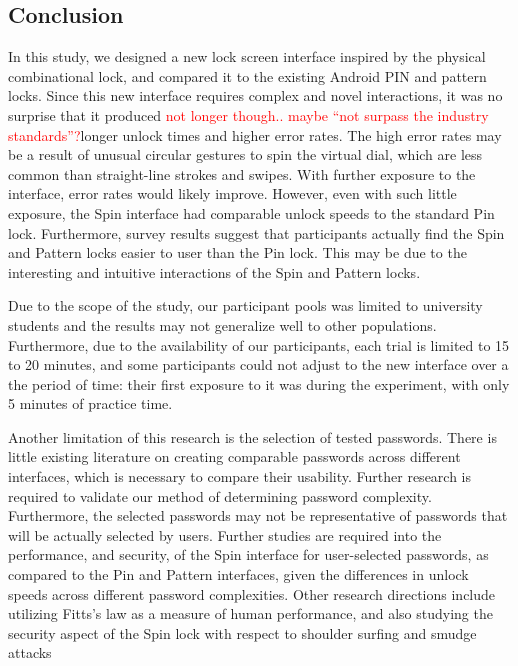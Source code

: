 \documentclass{sigchi}
\newcommand{\comment}[1]{\textcolor{red}{#1}}
\begin{document}
\subsection{Conclusion}
In this study, we designed a new lock screen interface inspired by the physical combinational lock, and compared it to the existing Android PIN and pattern locks. Since this new interface requires complex and novel interactions, it was no surprise that it produced \comment{not longer though.. maybe ``not surpass the industry standards''?}longer unlock times and higher error rates. The high error rates may be a result of unusual circular gestures to spin the virtual dial, which are less common than straight-line strokes and swipes. With further exposure to the interface, error rates would likely improve. However, even with such little exposure, the Spin interface had comparable unlock speeds to the standard Pin lock. Furthermore, survey results suggest that participants actually find the Spin and Pattern locks easier to user than the Pin lock. This may be due to the interesting and intuitive interactions of the Spin and Pattern locks. 

Due to the scope of the study, our participant pools was limited to university students and the results may not generalize well to other populations. Furthermore, due to the availability of our participants, each trial is limited to 15 to 20 minutes, and some participants could not adjust to the new interface over a the period of time: their first exposure to it was during the experiment, with only 5 minutes of practice time. 

Another limitation of this research is the selection of tested passwords. There is little existing literature on creating comparable passwords across different interfaces, which is necessary to compare their usability. Further research is required to validate our method of determining password complexity. Furthermore, the selected passwords may not be representative of passwords that will be actually selected by users. Further studies are required into the performance, and security, of the Spin interface for user-selected passwords, as compared to the Pin and Pattern interfaces, given the differences in unlock speeds across different password complexities. Other research directions include utilizing Fitts's law as a measure of human performance, and also studying the security aspect of the Spin lock with respect to shoulder surfing  and smudge attacks
\end{document}
